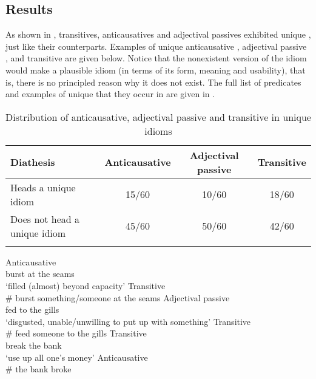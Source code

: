 \documentclass[output=paper]{langsci/langscibook}
\begin{document}
\ea\label{ex:20.7}
    \z
\ex \label{ex:20.8}
    \z
\z

\subsection{Results}  %

As shown in , transitives, anticausatives and
adjectival passives exhibited unique , just like their 
counterparts. Examples of unique anticausative , adjectival
passive , and transitive   are given below.
Notice that the nonexistent version of the idiom would make a plausible idiom
(in terms of its form, meaning and usability), that is, there is no principled
reason why it does not exist. The full list of predicates and examples of
unique  that they occur in are given in .

\begin{table}
\caption{Distribution of anticausative, adjectival passive
and transitive in unique idioms}\label{tab:20.1}
\begin{tabularx}{\textwidth}{lCCC}
\lsptoprule
Diathesis &  Anti\-causative &  Adjectival passive &  Transitive\\
\midrule
 Heads a unique idiom & 15/60 & 10/60 & 18/60\\
 Does not head a unique idiom & 45/60 & 50/60 & 42/60\\
\lspbottomrule
\end{tabularx}
\end{table}

\ea \label{ex:20.9}
    \ea  Anticausative\\
         burst at the seams\\
        \glt ‘filled (almost) beyond capacity’
    \ex Transitive\\
    \# burst something/someone at the seams
    \z
\ex \label{ex:20.10}
         \ea Adjectival passive\\
             fed to the gills\\
        \glt ‘disgusted, unable/unwilling to put up with something’
    \ex Transitive\\
     \# feed someone to the gills
    \z
\ex \label{ex:20.11}
    \ea Transitive\\
        break the bank\\
        \glt ‘use up all one’s money’
    \ex Anticausative\\
    \# the bank broke
    \z
\z
\end{document}
